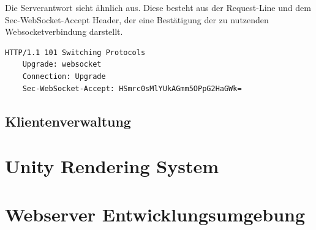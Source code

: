 Die Serverantwort sieht ähnlich aus. Diese besteht aus der Request-Line und dem Sec-WebSocket-Accept Header, der eine Bestätigung der zu nutzenden Websocketverbindung darstellt.

\begin{minipage}[]{\textwidth}
	\begin{lstlisting}[frame=trBL]
	HTTP/1.1 101 Switching Protocols
	Upgrade: websocket
	Connection: Upgrade
	Sec-WebSocket-Accept: HSmrc0sMlYUkAGmm5OPpG2HaGWk=
	\end{lstlisting}
	\label{listing:Serverantwort eines Websocket Handshake}
\end{minipage} 

\subsection{Klientenverwaltung}
\label{subsection:Klientenverwaltung}



\section{Unity Rendering System}
\label{section:Unity Rendering System}
\section{ Webserver Entwicklungsumgebung }
\label{section:Webserver Entwicklungsumgebung}

